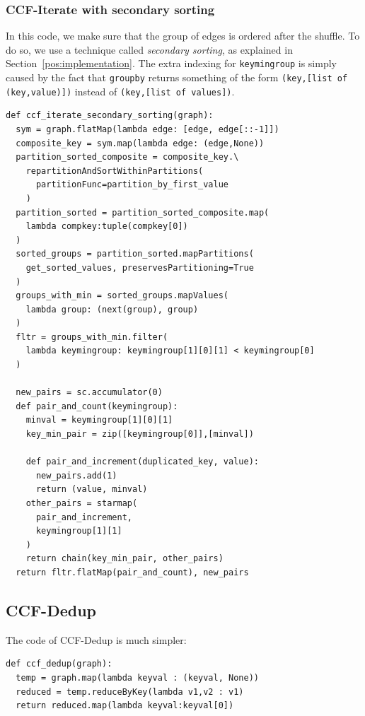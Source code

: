 \documentclass[a4paper,12pt]{article}
\begin{document}
\subsubsection{CCF-Iterate with secondary sorting}
\label{pos:secondarysorting}
In this code, we make sure that the group of edges is ordered after the shuffle. To do so, we use a technique called \emph{secondary sorting}, as explained in Section~\ref{pos:implementation}. The extra indexing for \verb|keymingroup| is simply caused by the fact that \verb|groupby| returns something of the form \verb|(key,[list of (key,value)])| instead of \verb|(key,[list of values])|.
\begin{verbatim}
def ccf_iterate_secondary_sorting(graph):
  sym = graph.flatMap(lambda edge: [edge, edge[::-1]])
  composite_key = sym.map(lambda edge: (edge,None))
  partition_sorted_composite = composite_key.\
    repartitionAndSortWithinPartitions(
      partitionFunc=partition_by_first_value
    )
  partition_sorted = partition_sorted_composite.map(
    lambda compkey:tuple(compkey[0])
  )
  sorted_groups = partition_sorted.mapPartitions(
    get_sorted_values, preservesPartitioning=True
  )
  groups_with_min = sorted_groups.mapValues(
    lambda group: (next(group), group)
  )
  fltr = groups_with_min.filter(
    lambda keymingroup: keymingroup[1][0][1] < keymingroup[0]
  )
  
  new_pairs = sc.accumulator(0)
  def pair_and_count(keymingroup):
    minval = keymingroup[1][0][1]
    key_min_pair = zip([keymingroup[0]],[minval])
    
    def pair_and_increment(duplicated_key, value):
      new_pairs.add(1)
      return (value, minval)
    other_pairs = starmap(
      pair_and_increment,
      keymingroup[1][1]
    )
    return chain(key_min_pair, other_pairs)
  return fltr.flatMap(pair_and_count), new_pairs
\end{verbatim}

\subsection{CCF-Dedup}
The code of CCF-Dedup is much simpler:
\begin{verbatim}
def ccf_dedup(graph):
  temp = graph.map(lambda keyval : (keyval, None))
  reduced = temp.reduceByKey(lambda v1,v2 : v1)
  return reduced.map(lambda keyval:keyval[0])
\end{verbatim}
\end{document}
